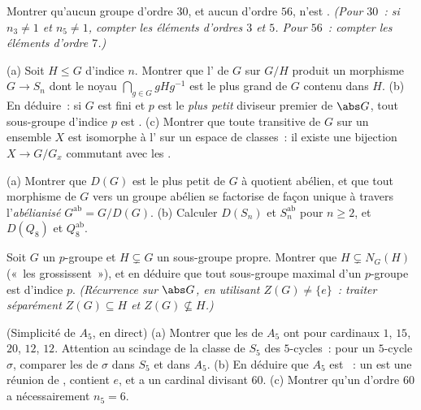 \begin{exercise}[$\star\star$]\label{exo:b3:groups:7}
Montrer qu'aucun groupe d'ordre $30$, et aucun d'ordre $56$,
n'est . \emph{(Pour $30$~: si $n_3 \neq 1$ et $n_5 \neq 1$,
compter les éléments d'ordres $3$ et $5$. Pour $56$~: compter les
éléments d'ordre $7$.)}
\end{exercise}

\begin{exercise}[$\star\star$]\label{exo:b3:groups:8}
(a) Soit $H \leq G$ d'indice $n$. Montrer que l' de $G$ sur
$G/H$ produit un morphisme $G \to S_n$ dont le noyau $\bigcap_{g
\in G} gHg^{-1}$ est le plus grand  de $G$
contenu dans $H$.
(b) En déduire~: si $G$ est fini et $p$ est le \emph{plus petit}
diviseur premier de $\abs G$, tout sous-groupe d'indice $p$ est
.
(c) Montrer que toute  transitive de $G$ sur un ensemble $X$
est isomorphe à l' sur un espace de classes~: il existe une
bijection $X \to G/G_x$ commutant avec les .
\end{exercise}

\begin{exercise}[$\star\star$]\label{exo:b3:groups:9}
(a) Montrer que $D(G)$ est le plus petit  de $G$
à quotient abélien, et que tout morphisme de $G$ vers un groupe
abélien se factorise de façon unique à travers
l'\emph{abélianisé} $G^{\mathrm{ab}} = G/D(G)$.
(b) Calculer $D(S_n)$ et $S_n^{\mathrm{ab}}$ pour $n \geq 2$, et
$D(Q_8)$ et $Q_8^{\mathrm{ab}}$.
\end{exercise}

\begin{exercise}[$\star\star$]\label{exo:b3:groups:10}
Soit $G$ un $p$-groupe et $H \subsetneq G$ un sous-groupe propre.
Montrer que $H \subsetneq N_G(H)$ («~les 
grossissent~»), et en déduire que tout sous-groupe maximal d'un
$p$-groupe est  d'indice $p$. \emph{(Récurrence sur $\abs
G$, en utilisant $Z(G) \neq \{e\}$~: traiter séparément $Z(G)
\subseteq H$ et $Z(G) \not\subseteq H$.)}
\end{exercise}

\begin{exercise}[$\star\star\star$]\label{exo:b3:groups:11}
(Simplicité de $A_5$, en direct)
(a) Montrer que les  de $A_5$ ont pour
cardinaux $1$, $15$, $20$, $12$, $12$. Attention au scindage de
la classe de $S_5$ des $5$-cycles~: pour un $5$-cycle $\sigma$,
comparer les  de $\sigma$ dans $S_5$ et dans
$A_5$.
(b) En déduire que $A_5$ est ~: un  est
une réunion de , contient $e$, et a un
cardinal divisant $60$.
(c) Montrer qu'un  d'ordre $60$ a nécessairement
$n_5 = 6$.
\end{exercise}

